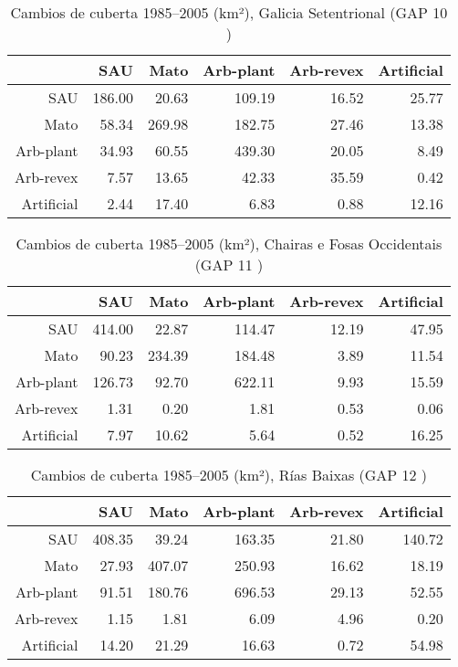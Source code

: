 \begin{table}[p]
\centering
\caption{Cambios de cuberta 1985--2005 (km²), Galicia Setentrional (GAP 10 )} 
\label{TaboaContinxGAP10}
\begin{tabular}{rrrrrr}
  \hline
 & SAU & Mato & Arb-plant & Arb-revex & Artificial \\ 
  \hline
SAU & 186.00 & 20.63 & 109.19 & 16.52 & 25.77 \\ 
  Mato & 58.34 & 269.98 & 182.75 & 27.46 & 13.38 \\ 
  Arb-plant & 34.93 & 60.55 & 439.30 & 20.05 & 8.49 \\ 
  Arb-revex & 7.57 & 13.65 & 42.33 & 35.59 & 0.42 \\ 
  Artificial & 2.44 & 17.40 & 6.83 & 0.88 & 12.16 \\ 
   \hline
\end{tabular}
\end{table}
\begin{table}[p]
\centering
\caption{Cambios de cuberta 1985--2005 (km²), Chairas e Fosas Occidentais (GAP 11 )} 
\label{TaboaContinxGAP11}
\begin{tabular}{rrrrrr}
  \hline
 & SAU & Mato & Arb-plant & Arb-revex & Artificial \\ 
  \hline
SAU & 414.00 & 22.87 & 114.47 & 12.19 & 47.95 \\ 
  Mato & 90.23 & 234.39 & 184.48 & 3.89 & 11.54 \\ 
  Arb-plant & 126.73 & 92.70 & 622.11 & 9.93 & 15.59 \\ 
  Arb-revex & 1.31 & 0.20 & 1.81 & 0.53 & 0.06 \\ 
  Artificial & 7.97 & 10.62 & 5.64 & 0.52 & 16.25 \\ 
   \hline
\end{tabular}
\end{table}
\begin{table}[p]
\centering
\caption{Cambios de cuberta 1985--2005 (km²), Rías Baixas (GAP 12 )} 
\label{TaboaContinxGAP12}
\begin{tabular}{rrrrrr}
  \hline
 & SAU & Mato & Arb-plant & Arb-revex & Artificial \\ 
  \hline
SAU & 408.35 & 39.24 & 163.35 & 21.80 & 140.72 \\ 
  Mato & 27.93 & 407.07 & 250.93 & 16.62 & 18.19 \\ 
  Arb-plant & 91.51 & 180.76 & 696.53 & 29.13 & 52.55 \\ 
  Arb-revex & 1.15 & 1.81 & 6.09 & 4.96 & 0.20 \\ 
  Artificial & 14.20 & 21.29 & 16.63 & 0.72 & 54.98 \\ 
   \hline
\end{tabular}
\end{table}
